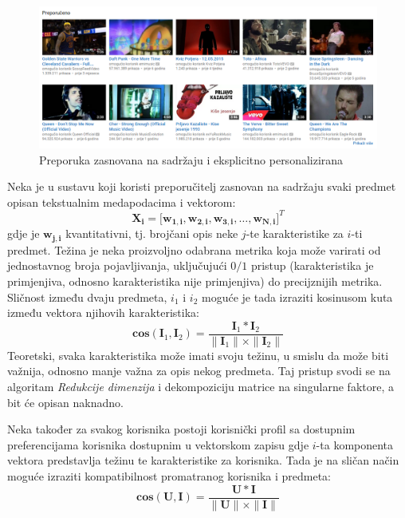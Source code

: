 \documentclass[times, utf8, diplomski, numeric]{fer}
\begin{document}
\begin{figure}[!htb]
	\centering
	\includegraphics[width=14.21cm]{images/content/personalizirani.png}
	\caption{Preporuka zasnovana na sadržaju i eksplicitno personalizirana}
	\label{fig:contentpers}
\end{figure}

Neka je u sustavu koji koristi preporučitelj zasnovan na sadržaju svaki predmet
opisan tekstualnim medapodacima i vektorom:
\begin{equation}
\label{eq:vektorKarakteristika}
	\boldsymbol{X_i} = 
		\big[ 
			\boldsymbol{w_{1,i}}, 
			\boldsymbol{w_{2,i}}, 
			\boldsymbol{w_{3,i}}, 
			\ldots, 
			\boldsymbol{w_{N,i}} 
		\big]^T
\end{equation}
gdje je $\boldsymbol{w_{j,i}}$ kvantitativni, tj. brojčani opis neke $j$-te
karakteristike za $i$-ti predmet. Težina je neka proizvoljno odabrana metrika
koja može varirati od jednostavnog broja pojavljivanja, uključujući $0/1$
pristup (karakteristika je primjenjiva, odnosno karakteristika nije
primjenjiva) do precijznijih metrika. Sličnost između dvaju predmeta, $i_1$ i
$i_2$ moguće je tada izraziti kosinusom kuta između vektora njihovih
karakteristika:
\begin{equation}
\label{eq:kosinus}
	\boldsymbol{cos}(\boldsymbol{I}_1, \boldsymbol{I}_2) = 
		\frac
			{\boldsymbol{I}_1 \ast \boldsymbol{I}_2}
			{\|\boldsymbol{I}_1\| \times \|\boldsymbol{I}_2\|}
\end{equation}
Teoretski, svaka karakteristika može imati svoju težinu, u smislu da može biti
važnija, odnosno manje važna za opis nekog predmeta. Taj pristup svodi se na
algoritam \emph{Redukcije dimenzija} i dekompoziciju matrice na singularne
faktore, a bit će opisan naknadno.

Neka također za svakog korisnika postoji korisnički profil sa dostupnim
preferencijama korisnika dostupnim u vektorskom zapisu gdje $i$-ta komponenta
vektora predstavlja težinu te karakteristike za korisnika. Tada je na sličan
način moguće izraziti kompatibilnost promatranog korisnika i predmeta:
\begin{equation}
\label{eq:cosUserItem}
	\boldsymbol{cos}(\boldsymbol{U}, \boldsymbol{I}) = 
		\frac
			{\boldsymbol{U} \ast \boldsymbol{I}}
			{\|\boldsymbol{U}\| \times \|\boldsymbol{I}\|}
\end{equation}
\end{document}
